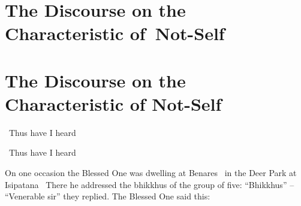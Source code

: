 
\ifbfive

\section{The Discourse on the Characteristic \mbox{of}~Not-Self}

\else

\section{The Discourse on the Characteristic of Not-Self}

\fi

\label{characteristic-of-not-self}

\ifninebythirteen

\vspace{0.1cm}

\begin{leader-english}
  \anglebracketleft\ \hspace{-0.5mm}Thus have I heard \hspace{-0.5mm}\anglebracketright\
\end{leader-english}

\vspace{-0.2cm}

\else

\begin{leader-english}
  \anglebracketleft\ \hspace{-0.5mm}Thus have I heard \hspace{-0.5mm}\anglebracketright\
\end{leader-english}

\fi

\begin{english-only-hang}
  On one occasion\makeatletter\hyperlink{endnote108-appendix}\makeatother
  \linkdest{endnote109-body}
  the Blessed One was dwelling at Benares \breathmark\ in the Deer Park at Isipatana \breathmark\ There he addressed the bhikkhus of the group of five: ``Bhikkhus'' – ``Venerable sir'' they replied. The Blessed One said this:\makeatletter\hyperlink{endnote109-appendix}\makeatother
\end{english-only-hang}

